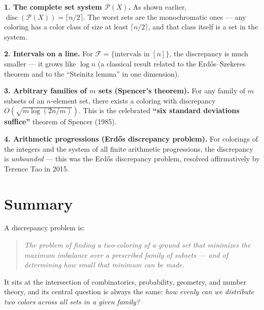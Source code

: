 \documentclass[11pt]{article}
\DeclareMathOperator{\disc}{disc}
\begin{document}
\textbf{1. The complete set system \(\mathcal{P}(X)\).}
As shown earlier, \(\disc(\mathcal{P}(X)) = \lceil n/2 \rceil\). The
worst sets are the monochromatic ones --- any coloring has a color class
of size at least \(\lceil n/2 \rceil\), and that class itself is a set in
the system.

\medskip
\textbf{2. Intervals on a line.}
For \(\mathcal{F} = \{\text{intervals in } [n]\}\), the discrepancy is
much smaller --- it grows like \(\log n\) (a classical result related to
the Erdős--Szekeres theorem and to the ``Steinitz lemma'' in one
dimension).

\medskip
\textbf{3. Arbitrary families of \(m\) sets (Spencer's theorem).}
For any family of \(m\) subsets of an \(n\)-element set, there exists a
coloring with discrepancy \(O(\sqrt{m \log(2n/m)})\). This is the
celebrated \textbf{``six standard deviations suffice''} theorem of
Spencer (1985).

\medskip
\textbf{4. Arithmetic progressions (Erdős discrepancy problem).}
For colorings of the integers and the system of all finite arithmetic
progressions, the discrepancy is \emph{unbounded} --- this was the
Erdős discrepancy problem, resolved affirmatively by Terence Tao in
2015.

\hrulefill

\section{Summary}

A discrepancy problem is:

\begin{quote}
\itshape
The problem of finding a two-coloring of a ground set that minimizes the
maximum imbalance over a prescribed family of subsets --- and of
determining how small that minimum can be made.
\end{quote}

It sits at the intersection of combinatorics, probability, geometry, and
number theory, and its central question is always the same: \emph{how
evenly can we distribute two colors across all sets in a given family?}
\end{document}
